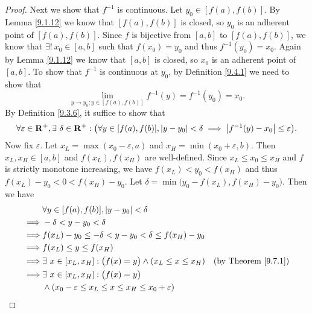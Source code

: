 \begin{proof}
    Next we show that \(f^{-1}\) is continuous.
    Let \(y_0 \in [f(a), f(b)]\).
    By Lemma \ref{9.1.12} we know that \([f(a), f(b)]\) is closed, so \(y_0\) is an adherent point of \([f(a), f(b)]\).
    Since \(f\) is bijective from \([a, b]\) to \([f(a), f(b)]\), we know that \(\exists!\ x_0 \in [a, b]\) such that \(f(x_0) = y_0\) and thus \(f^{-1}(y_0) = x_0\).
    Again by Lemma \ref{9.1.12} we know that \([a, b]\) is closed, so \(x_0\) is an adherent point of \([a, b]\).
    To show that \(f^{-1}\) is continuous at \(y_0\), by Definition \ref{9.4.1} we need to show that
    \[
        \lim_{y \to y_0 ; y \in [f(a), f(b)]} f^{-1}(y) = f^{-1}(y_0) = x_0.
    \]
    By Definition \ref{9.3.6}, it suffice to show that
    \[
        \forall \varepsilon \in \mathbf{R}^+, \exists\ \delta \in \mathbf{R}^+ : \big(\forall y \in [f(a), f(b)], \left\lvert y - y_0\right\rvert < \delta \implies \left\lvert f^{-1}(y) - x_0\right\rvert \leq \varepsilon\big).
    \]
    Now fix \(\varepsilon\).
    Let \(x_L = \max(x_0 - \varepsilon, a)\) and \(x_H = \min(x_0 + \varepsilon, b)\).
    Then \(x_L, x_H \in [a, b]\) and \(f(x_L), f(x_H)\) are well-defined.
    Since \(x_L \leq x_0 \leq x_H\) and \(f\) is strictly monotone increasing, we have \(f(x_L) < y_0 < f(x_H)\) and thus \(f(x_L) - y_0 < 0 < f(x_H) - y_0\).
    Let \(\delta = \min\big(y_0 - f(x_L), f(x_H) - y_0\big)\).
    Then we have
    \begin{align*}
                 & \forall y \in [f(a), f(b)], \abs{y - y_0} < \delta                                                                                  \\
        \implies & -\delta < y - y_0 < \delta                                                                                                          \\
        \implies & f(x_L) - y_0 \leq -\delta < y - y_0 < \delta \leq f(x_H) - y_0                                                                      \\
        \implies & f(x_L) \leq y \leq f(x_H)                                                                                                           \\
        \implies & \exists\ x \in [x_L, x_H] : \big(f(x) = y\big) \land (x_L \leq x \leq x_H)                        & \text{(by Theorem \ref{9.7.1})} \\
        \implies & \exists\ x \in [x_L, x_H] : \big(f(x) = y\big)                                                                                      \\
                 & \land (x_0 - \varepsilon \leq x_L \leq x \leq x_H \leq x_0 + \varepsilon)                                                           \\

\end{align*}
\end{proof}
